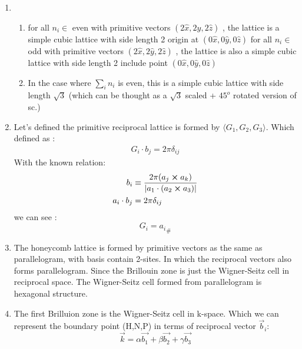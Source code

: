 \documentclass[notitlepage]{revtex4-1}
\begin{document}
\begin{CJK}{UTF8}{bsmi}
\begin{enumerate}
	\item
		\begin{enumerate}[label=(\alph*)] 
			\item 
				\subitem for all $n_i \in$ even with primitive vectors $(2\hat{x} , 2\hat{y} , 2\hat{z})$ , the lattice is a simple cubic lattice with side length 2 origin at $(0\hat{x},0\hat{y},0\hat{z})$
				\subitem for all $n_i \in$ odd with primitive vectors $(2\hat{x} , 2\hat{y} , 2\hat{z})$ , the lattice is also a simple cubic lattice with side length 2 include point $(0\hat{x},0\hat{y},0\hat{z})$ 
			\item 
				\subitem In the case where $\sum_{i} n_i$ is even, this is a simple cubic lattice with side length $\sqrt{3}$ (which can be thought as a $\sqrt{3}$ scaled + $45^o$ rotated version of sc.)
		\end{enumerate}
	\item
		Let's defined the primitive reciprocal lattice is formed by $\langle G_1 , G_2 , G_3 \rangle$.  Which defined as :
		\begin{equation}
			\begin{split}
				G_i \cdot b_j = 2\pi \delta_{ij} 
			\end{split}
		\end{equation} 
		With the known relation:
		\begin{equation}
			\begin{split}
				b_i &\equiv \frac{2\pi (a_j \cross a_k)}{|a_1 \cdot (a_2 \cross a_3) |} \\
				a_i \cdot b_j &= 2\pi \delta_{ij}
			\end{split}
		\end{equation}
		we can see :
		\begin{equation}
			G_i = {a_i}_{\#} 
		\end{equation}			
			
	\item The honeycomb lattice is formed by primitive vectors as the same as parallelogram, with basis contain 2-sites. In which the reciprocal vectors also forms parallelogram. Since the Brillouin zone is just the Wigner-Seitz cell in reciprocal space. The Wigner-Seitz cell formed from parallelogram is hexagonal structure.    
	
	\item The first Brilluion zone is the Wigner-Seitz cell in k-space. Which we can represent the boundary point (H,N,P) in terms of reciprocal vector $\vec{b}_i$:
	\begin{equation}
		\vec{k} = \alpha \vec{b_1} + \beta \vec{b_2} + \gamma \vec{b_3} 
	\end{equation}
	

\end{enumerate}
\end{CJK}
\end{document}
